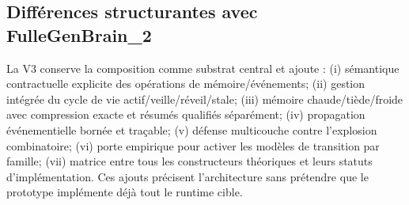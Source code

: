 \subsection{Différences structurantes avec FulleGenBrain\_2}
La V3 conserve la composition comme substrat central et ajoute : (i) sémantique contractuelle explicite des opérations de mémoire/événements; (ii) gestion intégrée du cycle de vie actif/veille/réveil/stale; (iii) mémoire chaude/tiède/froide avec compression exacte et résumés qualifiés séparément; (iv) propagation événementielle bornée et traçable; (v) défense multicouche contre l'explosion combinatoire; (vi) porte empirique pour activer les modèles de transition par famille; (vii) matrice entre tous les constructeurs théoriques et leurs statuts d'implémentation. Ces ajouts précisent l'architecture sans prétendre que le prototype implémente déjà tout le runtime cible.
